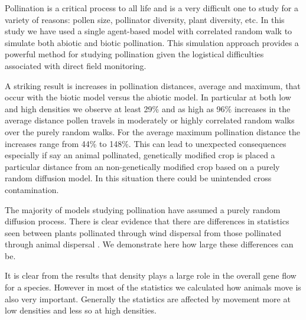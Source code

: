 Pollination is a critical process to all life and is a very difficult one to
study for a variety of reasons: pollen size, pollinator diversity, plant
diversity, etc.  In this study we have used a single agent-based model with
correlated random walk to simulate both abiotic and biotic pollination.  This
simulation approach provides a powerful method for studying pollination given
the logistical difficulties associated with direct field monitoring.

A striking result is increases in pollination distances, average and maximum,
that occur with the biotic model versus the abiotic model.  In particular at
both low and high densities we observe at least 29\% and as high as 96\%
increases in the average distance pollen travels in moderately or highly
correlated random walks over the purely random walks.  For the average maximum
pollination distance the increases range from 44\% to 148\%.  This can lead to
unexpected consequences especially if say an animal pollinated, genetically
modified crop is placed a particular distance from an non-genetically modified
crop based on a purely random diffusion model.  In this situation there could be
unintended cross contamination.


The majority of models studying pollination have assumed a purely random
diffusion process. There is clear evidence that there are differences in
statistics seen between plants pollinated through wind dispersal from those
pollinated through animal dispersal \cite{LevinKerster}.  We demonstrate here
how large these differences can be.

It is clear from the results that density plays a large role in the overall gene
flow for a species.  However in most of the statistics we calculated how animals
move is also very important.  Generally the statistics are affected by movement
more at low densities and less so at high densities.

